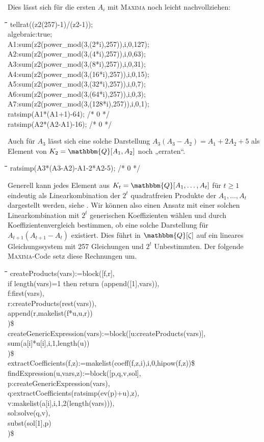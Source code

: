 \documentclass[11pt]{article}
\newcommand{\br}[1]{\ensuremath{\left(#1\right)}}
\newcommand{\Q}{\mathbbm{Q}}
\def\pw{{\char94}}
\newenvironment{code}{\tt \begin{tabbing}
\hskip12pt\=\hskip12pt\=\hskip12pt\=\hskip12pt\=\hskip5cm\=\hskip5cm\=\kill}
{\end{tabbing}}
\begin{document}
Dies lässt sich für die ersten $A_i$ mit \textsc{Maxima} noch leicht
nachvollziehen:
\begin{code}
tellrat((z2\pw(257)-1)/(z2-1));\\
algebraic:true;\\
A1:sum(z2\pw(power\_mod(3,(2*i),257)),i,0,127);\\
A2:sum(z2\pw(power\_mod(3,(4*i),257)),i,0,63);\\
A3:sum(z2\pw(power\_mod(3,(8*i),257)),i,0,31);\\
A4:sum(z2\pw(power\_mod(3,(16*i),257)),i,0,15);\\
A5:sum(z2\pw(power\_mod(3,(32*i),257)),i,0,7);\\
A6:sum(z2\pw(power\_mod(3,(64*i),257)),i,0,3);\\
A7:sum(z2\pw(power\_mod(3,(128*i),257)),i,0,1);\\
ratsimp(A1*(A1+1)-64);   /* 0 */\\
ratsimp(A2*(A2-A1)-16);  /* 0 */
\end{code}
Auch für $A_3$ lässt sich eine solche Darstellung $A_3\br{A_3-A_2}=A_1+2A_2+5$
als Element von $K_2=\Q[A_1,A_2]$ noch „erraten“.
\begin{code}
ratsimp(A3*(A3-A2)-A1-2*A2-5); /* 0 */
\end{code}
Generell kann jedes Element aus $K_t=\Q[A_1,\ldots,A_t]$ für $t\ge 1$
eindeutig als Linearkombination der $2^t$ quadratfreien Produkte der
$A_1,\ldots,A_t$ dargestellt werden, siehe \cite[Kapitel 4]{Graebe2020}.  Wir
können also einen Ansatz mit einer solchen Linearkombination mit $2^t$
generischen Koeffizienten wählen und durch Koeffizientenvergleich bestimmen,
ob eine solche Darstellung für $A_{t+1}\br{A_{t+1}-A_t}$ existiert. Dies führt
in $\Q[\zeta]$ auf ein lineares Gleichungssystem mit 257 Gleichungen und $2^t$
Unbestimmten. Der folgende \textsc{Maxima}-Code setz diese Rechnungen um.
\begin{code}  
createProducts(vars):=block([f,r],\+\\
  if length(vars)=1 then return (append([1],vars)),\\
  f:first(vars),\\
  r:createProducts(rest(vars)),\\
  append(r,makelist(f*u,u,r))\-\\
)\$\\[1em]

createGenericExpression(vars):=block([u:createProducts(vars)],\+\\
  sum(a[i]*u[i],i,1,length(u))\-\\
)\$\\[1em]

extractCoefficients(f,z):=makelist(coeff(f,z,i),i,0,hipow(f,z))\$\\[1em]

findExpression(u,vars,z):=block([p,q,v,sol],\+\\
p:createGenericExpression(vars),\\
q:extractCoefficients(ratsimp(ev(p)+u),z),\\
v:makelist(a[i],i,1,2\pw(length(vars))),\\
sol:solve(q,v),\\
subst(sol[1],p)\-\\
)\$
\end{code}
\end{document}
